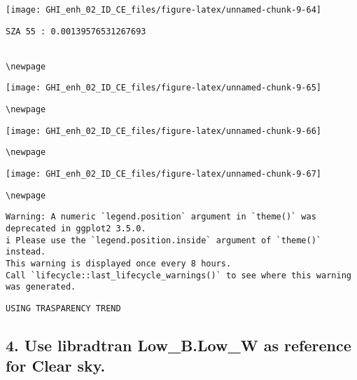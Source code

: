 \documentclass[
  10pt,
  a4paper,oneside]{article}
\begin{document}
\begin{center}\texttt{[image: GHI\_enh\_02\_ID\_CE\_files/figure-latex/unnamed-chunk-9-64]} \end{center}

\begin{verbatim}
SZA 55 : 0.00139576531267693 


\newpage
\end{verbatim}

\begin{center}\texttt{[image: GHI\_enh\_02\_ID\_CE\_files/figure-latex/unnamed-chunk-9-65]} \end{center}

\begin{verbatim}
\newpage
\end{verbatim}

\begin{center}\texttt{[image: GHI\_enh\_02\_ID\_CE\_files/figure-latex/unnamed-chunk-9-66]} \end{center}

\begin{verbatim}
\newpage
\end{verbatim}

\begin{center}\texttt{[image: GHI\_enh\_02\_ID\_CE\_files/figure-latex/unnamed-chunk-9-67]} \end{center}

\begin{verbatim}
\newpage
\end{verbatim}

\begin{verbatim}
Warning: A numeric `legend.position` argument in `theme()` was deprecated in ggplot2 3.5.0.
i Please use the `legend.position.inside` argument of `theme()` instead.
This warning is displayed once every 8 hours.
Call `lifecycle::last_lifecycle_warnings()` to see where this warning was generated.
\end{verbatim}

\begin{verbatim}
USING TRASPARENCY TREND
\end{verbatim}

\hypertarget{use-libradtran-low_b.low_w-as-reference-for-clear-sky.}{%
\subsection{\texorpdfstring{4. Use libradtran \textbf{Low\_B.Low\_W} as reference for Clear sky.}{4. Use libradtran Low\_B.Low\_W as reference for Clear sky.}}\label{use-libradtran-low_b.low_w-as-reference-for-clear-sky.}}
\end{document}
